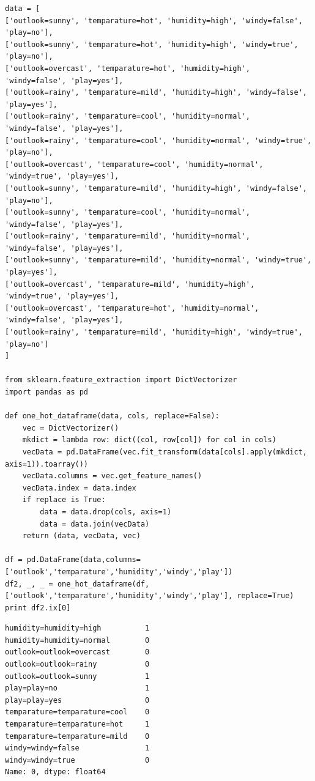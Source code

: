 \documentclass[12pt,fleqn]{article}\usepackage{../common}
\begin{document}
\begin{verbatim}
data = [
['outlook=sunny', 'temparature=hot', 'humidity=high', 'windy=false', 'play=no'],
['outlook=sunny', 'temparature=hot', 'humidity=high', 'windy=true', 'play=no'],
['outlook=overcast', 'temparature=hot', 'humidity=high', 'windy=false', 'play=yes'],
['outlook=rainy', 'temparature=mild', 'humidity=high', 'windy=false', 'play=yes'],
['outlook=rainy', 'temparature=cool', 'humidity=normal', 'windy=false', 'play=yes'],
['outlook=rainy', 'temparature=cool', 'humidity=normal', 'windy=true', 'play=no'],
['outlook=overcast', 'temparature=cool', 'humidity=normal', 'windy=true', 'play=yes'],
['outlook=sunny', 'temparature=mild', 'humidity=high', 'windy=false', 'play=no'],
['outlook=sunny', 'temparature=cool', 'humidity=normal', 'windy=false', 'play=yes'],
['outlook=rainy', 'temparature=mild', 'humidity=normal', 'windy=false', 'play=yes'],
['outlook=sunny', 'temparature=mild', 'humidity=normal', 'windy=true', 'play=yes'],
['outlook=overcast', 'temparature=mild', 'humidity=high', 'windy=true', 'play=yes'],
['outlook=overcast', 'temparature=hot', 'humidity=normal', 'windy=false', 'play=yes'],
['outlook=rainy', 'temparature=mild', 'humidity=high', 'windy=true', 'play=no']
]

from sklearn.feature_extraction import DictVectorizer
import pandas as pd

def one_hot_dataframe(data, cols, replace=False):
    vec = DictVectorizer()
    mkdict = lambda row: dict((col, row[col]) for col in cols)
    vecData = pd.DataFrame(vec.fit_transform(data[cols].apply(mkdict, axis=1)).toarray())
    vecData.columns = vec.get_feature_names()
    vecData.index = data.index
    if replace is True:
        data = data.drop(cols, axis=1)
        data = data.join(vecData)
    return (data, vecData, vec)

df = pd.DataFrame(data,columns=['outlook','temparature','humidity','windy','play'])
df2, _, _ = one_hot_dataframe(df, ['outlook','temparature','humidity','windy','play'], replace=True)
print df2.ix[0]
\end{verbatim}

\begin{verbatim}
humidity=humidity=high          1
humidity=humidity=normal        0
outlook=outlook=overcast        0
outlook=outlook=rainy           0
outlook=outlook=sunny           1
play=play=no                    1
play=play=yes                   0
temparature=temparature=cool    0
temparature=temparature=hot     1
temparature=temparature=mild    0
windy=windy=false               1
windy=windy=true                0
Name: 0, dtype: float64
\end{verbatim}
\end{document}
